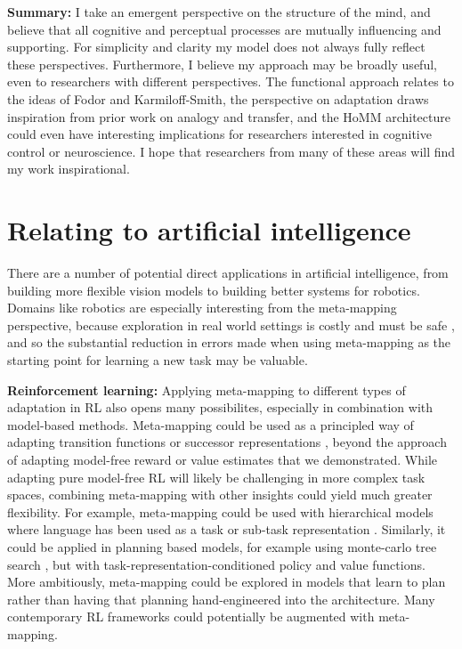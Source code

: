 \textbf{Summary:} I take an emergent perspective on the structure of the mind, and believe that all cognitive and perceptual processes are mutually influencing and supporting. For simplicity and clarity my model does not always fully reflect these perspectives. Furthermore, I believe my approach may be broadly useful, even to researchers with different perspectives. The functional approach relates to the ideas of Fodor and Karmiloff-Smith, the perspective on adaptation draws inspiration from prior work on analogy and transfer, and the HoMM architecture could even have interesting implications for researchers interested in cognitive control or neuroscience. I hope that researchers from many of these areas will find my work inspirational.

\section{Relating to artificial intelligence}

There are a number of potential direct applications in artificial intelligence, from building more flexible vision models to building better systems for robotics. Domains like robotics are especially interesting from the meta-mapping perspective, because exploration in real world settings is costly and must be safe \citep{Turchetta2016}, and so the substantial reduction in errors made when using meta-mapping as the starting point for learning a new task may be valuable. \par 

\textbf{Reinforcement learning:} Applying meta-mapping to different types of adaptation in RL also opens many possibilites, especially in combination with model-based methods. Meta-mapping could be used as a principled way of adapting transition functions or successor representations \citep[c.f.][]{Madarasz2019}, beyond the approach of adapting model-free reward or value estimates that we demonstrated. While adapting pure model-free RL will likely be challenging in more complex task spaces, combining meta-mapping with other insights could yield much greater flexibility. For example, meta-mapping could be used with hierarchical models where language has been used as a task or sub-task representation \citep[e.g.][]{Jiang2019}. Similarly, it could be applied in planning based models, for example using monte-carlo tree search \citep[as in e.g.][]{Silver2016, Silver2017}, but with task-representation-conditioned policy and value functions. More ambitiously, meta-mapping could be explored in models that learn to plan \citep{Guez2019} rather than having that planning hand-engineered into the architecture. Many contemporary RL frameworks could potentially be augmented with meta-mapping. \par

